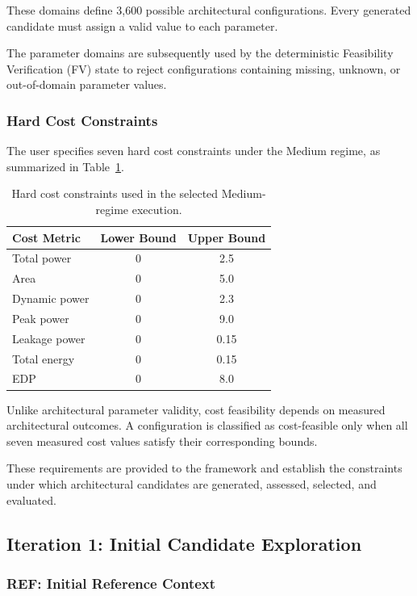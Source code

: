 These domains define 3,600 possible architectural
configurations. Every generated candidate must
assign a valid value to each parameter.

The parameter domains are subsequently used by
the deterministic Feasibility Verification (FV)
state to reject configurations containing
missing, unknown, or out-of-domain parameter
values.

\subsubsection{Hard Cost Constraints}

The user specifies seven hard cost constraints
under the Medium regime, as summarized in
Table~\ref{tab:appendix_cost_bounds}.

\begin{table}[htbp]
\centering
\caption{Hard cost constraints used in the
selected Medium-regime execution.}
\label{tab:appendix_cost_bounds}
\renewcommand{\arraystretch}{1.1}
\begin{tabular}{lcc}
\hline
\textbf{Cost Metric} &
\textbf{Lower Bound} &
\textbf{Upper Bound} \\
\hline
Total power & 0 & 2.5 \\
Area & 0 & 5.0 \\
Dynamic power & 0 & 2.3 \\
Peak power & 0 & 9.0 \\
Leakage power & 0 & 0.15 \\
Total energy & 0 & 0.15 \\
EDP & 0 & 8.0 \\
\hline
\end{tabular}
\end{table}

Unlike architectural parameter validity,
cost feasibility depends on measured
architectural outcomes. A configuration is
classified as cost-feasible only when all
seven measured cost values satisfy their
corresponding bounds.

These requirements are provided to the
framework and establish the constraints
under which architectural candidates are
generated, assessed, selected, and evaluated.


\subsection{Iteration 1: Initial Candidate Exploration}
\label{app:illustrative_iteration1}

\subsubsection{REF: Initial Reference Context}
\label{app:illustrative_ref}

